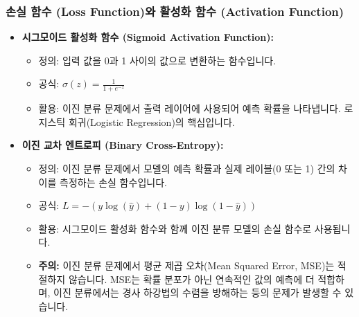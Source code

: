 \documentclass[11pt,a4paper]{article}
\begin{document}
\subsubsection{손실 함수 (Loss Function)와 활성화 함수 (Activation Function)}
\begin{itemize}
    \item \textbf{시그모이드 활성화 함수 (Sigmoid Activation Function):}
        \begin{itemize}
            \item 정의: 입력 값을 0과 1 사이의 값으로 변환하는 함수입니다.
            \item 공식: $\sigma(z) = \frac{1}{1 + e^{-z}}$
            \item 활용: 이진 분류 문제에서 출력 레이어에 사용되어 예측 확률을 나타냅니다. 로지스틱 회귀(Logistic Regression)의 핵심입니다.
        \end{itemize}
    \item \textbf{이진 교차 엔트로피 (Binary Cross-Entropy):}
        \begin{itemize}
            \item 정의: 이진 분류 문제에서 모델의 예측 확률과 실제 레이블(0 또는 1) 간의 차이를 측정하는 손실 함수입니다.
            \item 공식: $L = - (y \log(\hat{y}) + (1 - y) \log(1 - \hat{y}))$
            \item 활용: 시그모이드 활성화 함수와 함께 이진 분류 모델의 손실 함수로 사용됩니다.
        \item \textbf{주의:} 이진 분류 문제에서 평균 제곱 오차(Mean Squared Error, MSE)는 적절하지 않습니다. MSE는 확률 분포가 아닌 연속적인 값의 예측에 더 적합하며, 이진 분류에서는 경사 하강법의 수렴을 방해하는 등의 문제가 발생할 수 있습니다.
        \end{itemize}
\end{itemize}
\end{document}
